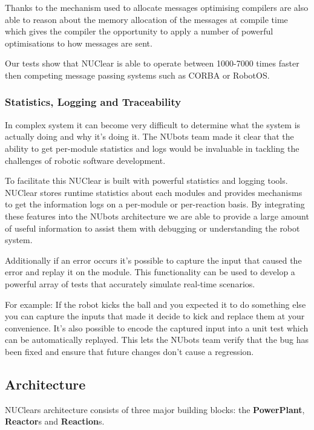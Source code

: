 \documentclass[english,12pt]{scrartcl}
\begin{document}
				Thanks to the mechanism used to allocate messages optimising compilers are also able to reason about the memory allocation of the messages at compile time which gives the compiler the opportunity to apply a number of powerful optimisations to how messages are sent.
				
				Our tests show that NUClear is able to operate between 1000-7000 times faster then competing message passing systems such as CORBA or RobotOS.
				
			\subsubsection{Statistics, Logging and Traceability}
				In complex system it can become very difficult to determine what the system is actually doing and why it's doing it. 
				The NUbots team made it clear that the ability to get per-module statistics and logs would be invaluable in tackling the challenges of robotic software development.
				
				To facilitate this NUClear is built with powerful statistics and logging tools.
				NUClear stores runtime statistics about each modules and provides mechanisms to get the information logs on a per-module or per-reaction basis. 
				By integrating these features into the NUbots architecture we are able to provide a large amount of useful information to assist them with debugging or understanding the robot system. 
				
				Additionally if an error occurs it's possible to capture the input that caused the error and replay it on the module. 
				This functionality can be used to develop a powerful array of tests that accurately simulate real-time scenarios.
				
				For example: If the robot kicks the ball and you expected it to do something else you can capture the inputs that made it decide to kick and replace them at your convenience. 
				It's also possible to encode the captured input into a unit test which can be automatically replayed. 
				This lets the NUbots team verify that the bug has been fixed and ensure that future changes don't cause a regression.
		
		\subsection{Architecture}
			NUClears architecture consists of three major building blocks: the \textbf{PowerPlant}, \textbf{Reactor}s and \textbf{Reaction}s. 
		
\end{document}
